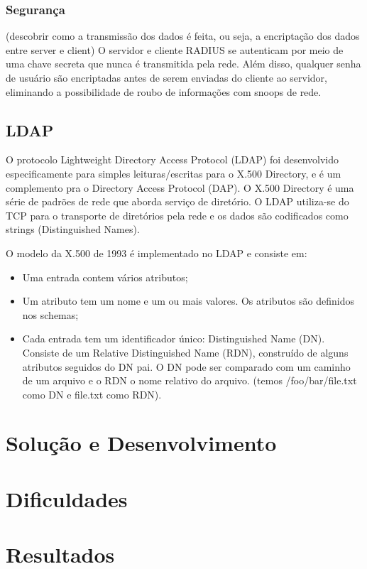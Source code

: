 \subsubsection{Segurança}

(descobrir como a transmissão dos dados é feita, ou seja, a encriptação dos dados entre
server e client)
O servidor e cliente RADIUS se autenticam por meio de uma chave secreta que nunca é
transmitida pela rede. Além disso, qualquer senha de usuário são encriptadas antes de
serem enviadas do cliente ao servidor, eliminando a possibilidade de roubo de informações
com snoops de rede.

\subsection{LDAP}

O protocolo Lightweight Directory Access Protocol (LDAP) foi desenvolvido especificamente
para simples leituras/escritas para o X.500 Directory, e é um complemento pra o Directory
Access Protocol (DAP). O X.500 Directory é uma série de padrões de rede que aborda serviço
de diretório. O LDAP utiliza-se do TCP para o transporte de diretórios pela rede e os dados
são codificados como strings (Distinguished Names).

O modelo da X.500 de 1993 é implementado no LDAP e consiste em:
\begin{itemize}
  \item Uma entrada contem vários atributos;
  \item Um atributo tem um nome e um ou mais valores. Os atributos são definidos nos schemas;
  \item Cada entrada tem um identificador único: Distinguished Name (DN). Consiste de um
    Relative Distinguished Name (RDN), construído de alguns atributos seguidos do DN pai.
    O DN pode ser comparado com um caminho de um arquivo e o RDN o nome relativo do arquivo.
    (temos /foo/bar/file.txt como DN e file.txt como RDN).
\end{itemize}

\section{Solução e Desenvolvimento}

\section{Dificuldades}

\section{Resultados}

